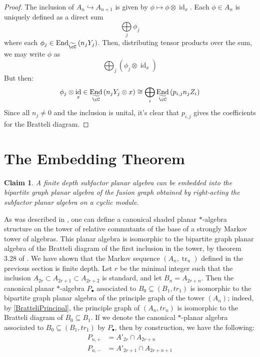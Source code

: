 \documentclass[11pt]{article}
\theoremstyle{plain}
\newtheorem*{claim*}{Claim}
\theoremstyle{definition}
\DeclareMathOperator{\End}{End}
\DeclareMathOperator{\id}{id}
\DeclareMathOperator{\tr}{tr}
\begin{document}
\begin{proof}
The inclusion of $A_n \hookrightarrow A_{n+1}$ is given by $\phi \mapsto \phi \otimes \id_{x}$. Each $\phi \in A_n$ is uniquely defined as a direct sum 
$$\bigoplus\limits_{j}\phi_j$$
where each $\phi_j \in \End_{\widetilde{\cC}}\left(n_jY_j\right)$. Then, distributing tensor products over the sum, we may write $\phi$ as 
$$\bigoplus_{j}\left(\phi_j \otimes \id_{x}\right)$$
But then:
$$\phi_j \otimes \id_{x} \in \End_{\widetilde{\cC}}\left(n_j Y_j \otimes x\right)\cong \bigoplus\limits_{i} \End_{\widetilde{\cC}}\left( p_{i,j} n_j Z_i\right)$$
Since all $n_j\neq 0$ and the inclusion is unital, it's clear that $p_{i,j}$ gives the coefficients for the Bratteli diagram.
\end{proof}



\section{The Embedding Theorem}

\begin{claim*}
A finite depth subfactor planar algebra can be embedded into the bipartite graph planar algebra of the fusion graph obtained by right-acting the subfactor planar algebra on a cyclic module.
\end{claim*}
As was described in \cite{penneys}, one can define a canonical shaded planar $*$-algebra structure on the tower of relative commutants of the base of a strongly Markov tower of algebras. %
This planar algebra is isomorphic to the bipartite graph planar algebra of the Bratteli diagram of the first inclusion in the tower, by theorem 3.28 of \cite{penneys}. We have shown that the Markov sequence $(A_n,\tr_n)$ defined in the previous section is finite depth. Let $r$ be the minimal integer such that the inclusion $A_{2r} \subset A_{2r+1} \subset A_{2r+2}$ is standard, and let $B_n=A_{2r+n}$. Then the canonical planar $*$-algebra $P_\bullet$ associated to $B_0\subseteq (B_1,tr_1)$ is isomorphic to the bipartite graph planar algebra of the principle graph of the tower $\left(A_{n}\right)$; indeed, by \ref{BratteliPrincipal}, the principle graph of $(A_{n},tr_n)$ is isomorphic to the Bratteli diagram of $B_0\subseteq B_1$.
If we denote the canonical $*$-planar algebra associated to $B_0\subseteq(B_1,tr_1)$ by $P_{\bullet}$, then by construction, we have the following:
\begin{align*}
	P_{n,+} &=  A'_{2r}\cap A_{2r+n} \\
	P_{n,-}  &= A'_{2r+1}\cap A_{2r+n+1} 
\end{align*}
\end{document}
